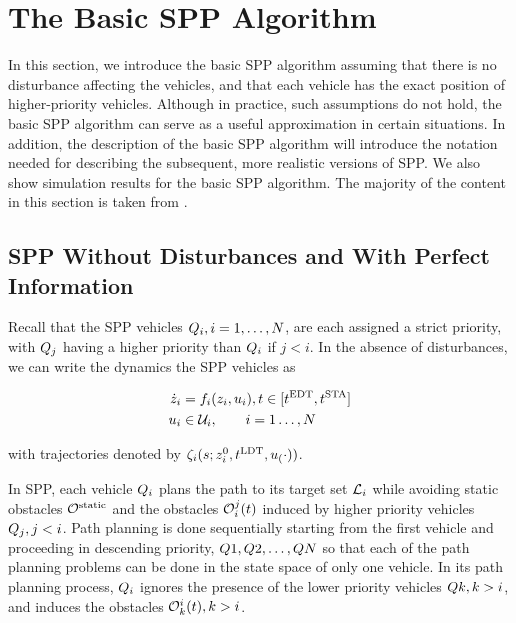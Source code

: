 \section{The Basic SPP Algorithm\label{sec:basic}}
In this section, we introduce the basic SPP algorithm assuming that there is no disturbance affecting the vehicles, and that each vehicle has the exact position of higher-priority vehicles. Although in practice, such assumptions do not hold, the basic SPP algorithm can serve as a useful approximation in certain situations. In addition, the description of the basic SPP algorithm will introduce the notation needed for describing the subsequent, more realistic versions of SPP. We also show simulation results for the basic SPP algorithm. The majority of the content in this section is taken from \cite{Chen15}.

\subsection{SPP Without Disturbances and With Perfect Information}
Recall that the SPP vehicles $Q_i, i=1,\ldots,N$, are each assigned a strict priority, with $Q_j$ having a higher priority than $Q_i$ if $j<i$. In the absence of disturbances, we can write the dynamics the SPP vehicles as

\begin{equation}
\label{eq:dyn_no_dstb}
\begin{aligned}
\dot\state_i &= \fdyn_i(\state_i, \ctrl_i), t \in [\edt, \sta] \\
\ctrl_i &\in \cset_i, \qquad i = 1 \ldots, \N
\end{aligned}
\end{equation}

\noindent with trajectories denoted by $\zeta_i(s; z^0_i, t^\text{LDT}, u_(\cdot))$.

In SPP, each vehicle $Q_i$ plans the path to its target set $\mathcal{L}_i$ while avoiding static obstacles $\mathcal{O}^\text{static}$ and the obstacles $\mathcal{O}_i^j(t)$ induced by higher priority vehicles $Q_j, j<i$. Path planning is done sequentially starting from the first vehicle and proceeding in descending priority, $Q{1}, Q{2}, \ldots, Q{N}$ so that each of the path planning problems can be done in the state space of only one vehicle. In its path planning process, $Q_i$ ignores the presence of the lower priority vehicles $Q{k}, k>i$, and induces the obstacles $\mathcal{O}_k^i(t), k>i$.

